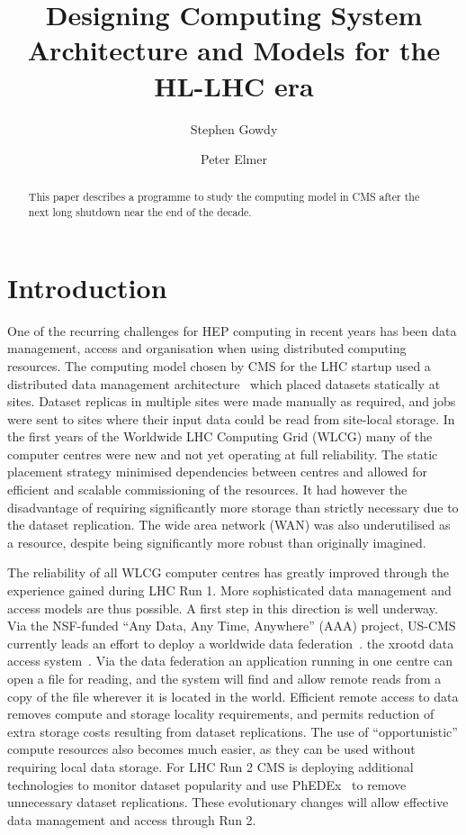 \documentclass[a4paper]{jpconf}
\begin{document}
\title{Designing Computing System Architecture and Models for the HL-LHC era}

\author{Stephen Gowdy}

\address{Fermilab, Batavia, IL 60510, USA}


\author{Peter Elmer}

\address{Department of Physics, Princeton University, Princeton, NJ
  08540, USA}


\begin{abstract}
This paper describes a programme to study the computing model in CMS after 
the next long shutdown near the end of the decade.
\end{abstract}

\section{Introduction}

One of the recurring challenges for HEP computing in recent years
has been data management, access and organisation when using
distributed computing resources.  The computing model chosen by CMS
for the LHC startup used a distributed data management
architecture~\cite{CMSCTDR} which placed datasets statically at
sites. Dataset replicas in multiple sites were made manually as
required, and jobs were sent to sites where their input data could
be read from site-local storage.  In the first years of the Worldwide
LHC Computing Grid (WLCG) many of the computer centres were new and
not yet operating at full reliability. The static placement strategy
minimised dependencies between centres and allowed for efficient
and scalable commissioning of the resources.  It had however the
disadvantage of requiring significantly more storage than strictly
necessary due to the dataset replication. The wide area network
(WAN) was also underutilised as a resource, despite being significantly
more robust than originally imagined.

The reliability of all WLCG computer centres has greatly improved
through the experience gained during LHC Run 1. More sophisticated
data management and access models are thus possible. A first step
in this direction is well underway. Via the NSF-funded ``Any Data,
Any Time, Anywhere'' (AAA) project, US-CMS currently leads an effort
to deploy a worldwide data federation~\cite{AAACHEP13}.  %
the xrootd data access system~\cite{XROOTD1}.  Via the data federation
an application running in one centre can open a file for reading,
and the system will find and allow remote reads from a copy of the
file wherever it is located in the world. Efficient remote access
to data removes compute and storage locality requirements, and
permits reduction of extra storage costs resulting from dataset
replications.  The use of ``opportunistic'' compute resources also
becomes much easier, as they can be used without requiring local
data storage.  For LHC Run 2 CMS is deploying additional technologies
to monitor dataset popularity and use PhEDEx~\cite{PHEDEX} to remove
unnecessary dataset replications. These evolutionary changes will
allow effective data management and access through Run 2.
\end{document}
